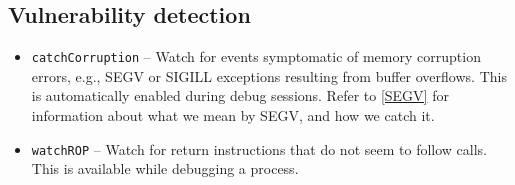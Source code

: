 \documentclass[titlepage]{article}
\begin{document}
\subsection{Vulnerability detection}
\begin{itemize}
\item {\tt catchCorruption} – Watch for events symptomatic of memory corruption errors, e.g., SEGV or SIGILL exceptions resulting from buffer overflows.  This is automatically enabled during debug sessions. Refer to \ref{SEGV} for information about what we mean by SEGV, and how we catch it.

\item {\tt watchROP} -- Watch for return instructions that do not seem to follow calls.  This is available while debugging a process.
\end{itemize}
\end{document}
